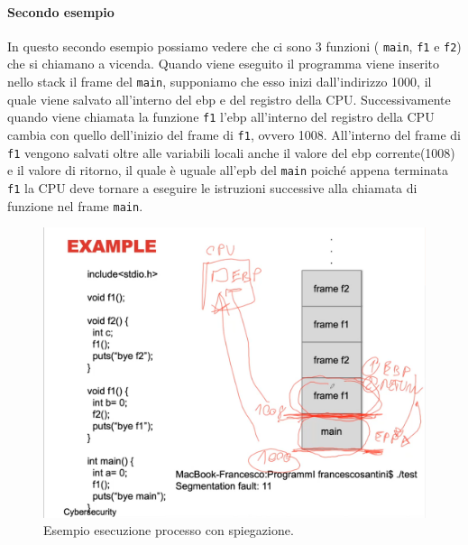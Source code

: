 \paragraph{Secondo esempio}
In questo secondo esempio possiamo vedere che ci sono 3 funzioni ( \verb|main|, \verb|f1| e \verb|f2|) che si chiamano a vicenda. Quando viene eseguito il programma viene inserito nello stack il frame del \verb|main|, supponiamo che esso inizi dall'indirizzo 1000, il quale viene salvato all'interno del ebp e del registro della CPU. Successivamente quando viene chiamata la funzione \verb|f1| l'ebp all'interno del registro della CPU cambia con quello dell'inizio del frame di \verb|f1|, ovvero 1008. All'interno del frame di \verb|f1| vengono salvati oltre alle variabili locali anche il valore del ebp corrente(1008) e il valore di ritorno, il quale è uguale all'epb del \verb|main| poiché appena terminata \verb|f1| la CPU deve tornare a eseguire le istruzioni successive alla chiamata di funzione nel frame \verb|main|.
\begin{figure}[H]
    \centering
    \includegraphics[width=13cm, keepaspectratio]{capitoli/secure_coding/img/cap_2/es_process_spiegato.png}
    \caption{Esempio esecuzione processo con spiegazione.}\label{fig:es_esec_processo2}
\end{figure}

